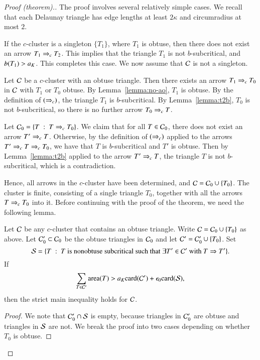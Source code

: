 \begin{proof}[Proof (theorem).] 
  The proof involves several relatively simple cases.  
  We recall that each Delaunay triangle has edge lengths at
  least $2\kappa$ and circumradius at most $2$.

  If the $c$-cluster is a singleton $\{T_1\}$, where $T_1$ is obtuse,
  then there does not exist an arrow 
$T_1\ra{c} T_2$.  This implies that the triangle $T_1$ is
  not $b$-subcritical, and $b(T_1) > \aK$.  This completes this case.
  We now assume that $\C$ is not a singleton.

  Let $\C$ be a $c$-cluster with an obtuse triangle.  Then there
  exists an arrow $T_1 \ra{c} T_0$ in $\C$ with $T_1$ or $T_0$ obtuse.
  By Lemma~\ref{lemma:no-ao}, $T_1$ is obtuse.  By the definition of
  $(\ra{c})$, the triangle $T_1$ is $b$-subcritical.  By
  Lemma~\ref{lemma:t2b}, $T_0$ is not $b$-subcritical, so there is no
  further arrow $T_0\ra{c} T$.

  Let $\C_0 = \{ T \mid T\ra{c} T_0\}$.  We claim that for all $T\in
  \C_0$, there does not exist an arrow $T' \ra{c} T$.  Otherwise, by
  the definition of $(\ra{c})$ applied to the arrows $T'\ra{c} T\ra{c}
  T_0$, we have that $T$ is $b$-subcritical and $T'$ is obtuse.  Then
  by Lemma~\ref{lemma:t2b} applied to the arrow $T'\ra{c} T$, the
  triangle $T$ is not $b$-subcritical, which is a contradiction.

  Hence, all arrows in the $c$-cluster have been determined, and $\C =
  \C_0 \cup \{T_0\}$.  The cluster is finite, consisting of a single
  triangle $T_0$, together with all the arrows $T\ra{c} T_0$ into it.
  Before continuing with the proof of the theorem, we need the
  following lemma.

\begin{lemma} Let $\C$ be any $c$-cluster that contains an obtuse
  triangle.  Write $\C = \C_0 \cup \{T_0\}$ as above.  Let
  $\C_0'\subset \C_0$ be the obtuse triangles in $\C_0$ and let $\C' =
  \C_0' \cup \{T_0\}$.  Set
\[
\S = \{T \mid T \text{ is nonobtuse subcritical such that } \exists
T'\in \C' \text{ with } T\Ra T'\}.
\]
If
\begin{equation}\label{eqn:S}
\sum_{T\in \C'} \area(T) > a_K \card(\C') + \epso \card(\S),
\end{equation}
then the strict main inequality holds for $\C$.
\end{lemma}

\begin{proof}
  We note that $\C_0' \cap \S$ is empty, because triangles in $\C_0'$
  are obtuse and triangles in $\S$ are not.
  We break the proof into two cases depending on whether $T_0$ is
  obtuse.


\end{proof}
\end{proof}
